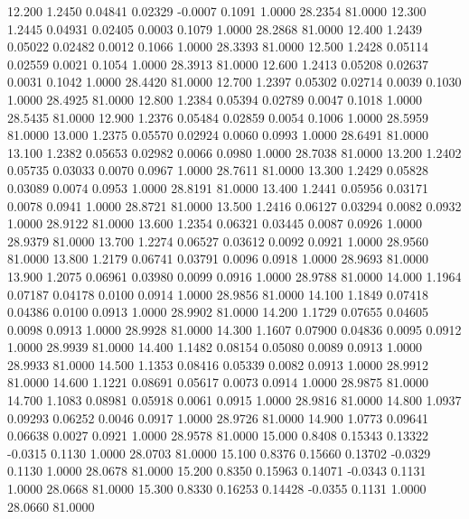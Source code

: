   12.200   1.2450   0.04841   0.02329  -0.0007   0.1091   1.0000  28.2354  81.0000
  12.300   1.2445   0.04931   0.02405   0.0003   0.1079   1.0000  28.2868  81.0000
  12.400   1.2439   0.05022   0.02482   0.0012   0.1066   1.0000  28.3393  81.0000
  12.500   1.2428   0.05114   0.02559   0.0021   0.1054   1.0000  28.3913  81.0000
  12.600   1.2413   0.05208   0.02637   0.0031   0.1042   1.0000  28.4420  81.0000
  12.700   1.2397   0.05302   0.02714   0.0039   0.1030   1.0000  28.4925  81.0000
  12.800   1.2384   0.05394   0.02789   0.0047   0.1018   1.0000  28.5435  81.0000
  12.900   1.2376   0.05484   0.02859   0.0054   0.1006   1.0000  28.5959  81.0000
  13.000   1.2375   0.05570   0.02924   0.0060   0.0993   1.0000  28.6491  81.0000
  13.100   1.2382   0.05653   0.02982   0.0066   0.0980   1.0000  28.7038  81.0000
  13.200   1.2402   0.05735   0.03033   0.0070   0.0967   1.0000  28.7611  81.0000
  13.300   1.2429   0.05828   0.03089   0.0074   0.0953   1.0000  28.8191  81.0000
  13.400   1.2441   0.05956   0.03171   0.0078   0.0941   1.0000  28.8721  81.0000
  13.500   1.2416   0.06127   0.03294   0.0082   0.0932   1.0000  28.9122  81.0000
  13.600   1.2354   0.06321   0.03445   0.0087   0.0926   1.0000  28.9379  81.0000
  13.700   1.2274   0.06527   0.03612   0.0092   0.0921   1.0000  28.9560  81.0000
  13.800   1.2179   0.06741   0.03791   0.0096   0.0918   1.0000  28.9693  81.0000
  13.900   1.2075   0.06961   0.03980   0.0099   0.0916   1.0000  28.9788  81.0000
  14.000   1.1964   0.07187   0.04178   0.0100   0.0914   1.0000  28.9856  81.0000
  14.100   1.1849   0.07418   0.04386   0.0100   0.0913   1.0000  28.9902  81.0000
  14.200   1.1729   0.07655   0.04605   0.0098   0.0913   1.0000  28.9928  81.0000
  14.300   1.1607   0.07900   0.04836   0.0095   0.0912   1.0000  28.9939  81.0000
  14.400   1.1482   0.08154   0.05080   0.0089   0.0913   1.0000  28.9933  81.0000
  14.500   1.1353   0.08416   0.05339   0.0082   0.0913   1.0000  28.9912  81.0000
  14.600   1.1221   0.08691   0.05617   0.0073   0.0914   1.0000  28.9875  81.0000
  14.700   1.1083   0.08981   0.05918   0.0061   0.0915   1.0000  28.9816  81.0000
  14.800   1.0937   0.09293   0.06252   0.0046   0.0917   1.0000  28.9726  81.0000
  14.900   1.0773   0.09641   0.06638   0.0027   0.0921   1.0000  28.9578  81.0000
  15.000   0.8408   0.15343   0.13322  -0.0315   0.1130   1.0000  28.0703  81.0000
  15.100   0.8376   0.15660   0.13702  -0.0329   0.1130   1.0000  28.0678  81.0000
  15.200   0.8350   0.15963   0.14071  -0.0343   0.1131   1.0000  28.0668  81.0000
  15.300   0.8330   0.16253   0.14428  -0.0355   0.1131   1.0000  28.0660  81.0000
